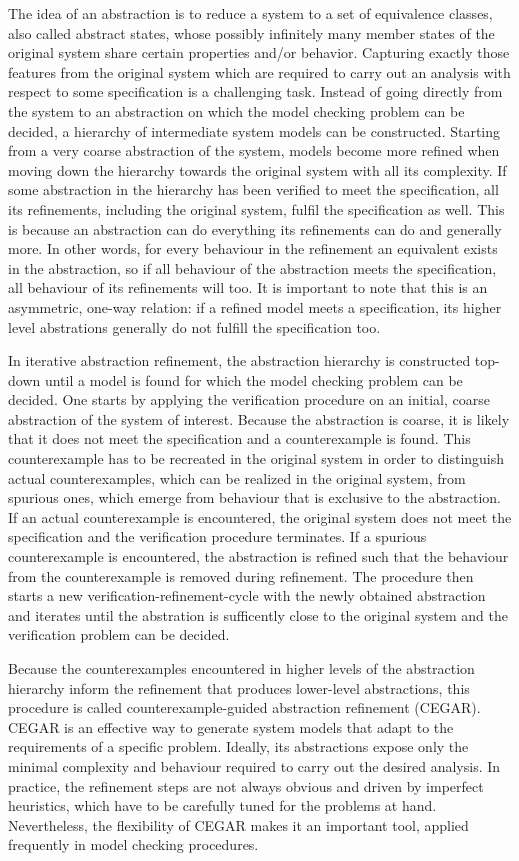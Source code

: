 The idea of an abstraction is to reduce a system to a set of equivalence classes, also called abstract states, whose possibly infinitely many member states of the original system share certain properties and/or behavior.
Capturing exactly those features from the original system which are required to carry out an analysis with respect to some specification is a challenging task.
Instead of going directly from the system to an abstraction on which the model checking problem can be decided, a hierarchy of intermediate system models can be constructed.
Starting from a very coarse abstraction of the system, models become more refined when moving down the hierarchy towards the original system with all its complexity.
If some abstraction in the hierarchy has been verified to meet the specification, all its refinements, including the original system, fulfil the specification as well.
This is because an abstraction can do everything its refinements can do and generally more.
In other words, for every behaviour in the refinement an equivalent exists in the abstraction, so if all behaviour of the abstraction meets the specification, all behaviour of its refinements will too.
It is important to note that this is an asymmetric, one-way relation: if a refined model meets a specification, its higher level abstrations generally do not fulfill the specification too.

In iterative abstraction refinement, the abstraction hierarchy is constructed top-down until a model is found for which the model checking problem can be decided.
One starts by applying the verification procedure on an initial, coarse abstraction of the system of interest.
Because the abstraction is coarse, it is likely that it does not meet the specification and a counterexample is found.
This counterexample has to be recreated in the original system in order to distinguish actual counterexamples, which can be realized in the original system, from spurious ones, which emerge from behaviour that is exclusive to the abstraction.
If an actual counterexample is encountered, the original system does not meet the specification and the verification procedure terminates.
If a spurious counterexample is encountered, the abstraction is refined such that the behaviour from the counterexample is removed during refinement.
The procedure then starts a new verification-refinement-cycle with the newly obtained abstraction and iterates until the abstration is sufficently close to the original system and the verification problem can be decided.

Because the counterexamples encountered in higher levels of the abstraction hierarchy inform the refinement that produces lower-level abstractions, this procedure is called counterexample-guided abstraction refinement (CEGAR).
CEGAR is an effective way to generate system models that adapt to the requirements of a specific problem.
Ideally, its abstractions expose only the minimal complexity and behaviour required to carry out the desired analysis.
In practice, the refinement steps are not always obvious and driven by imperfect heuristics, which have to be carefully tuned for the problems at hand.
Nevertheless, the flexibility of CEGAR makes it an important tool, applied frequently in model checking procedures.

